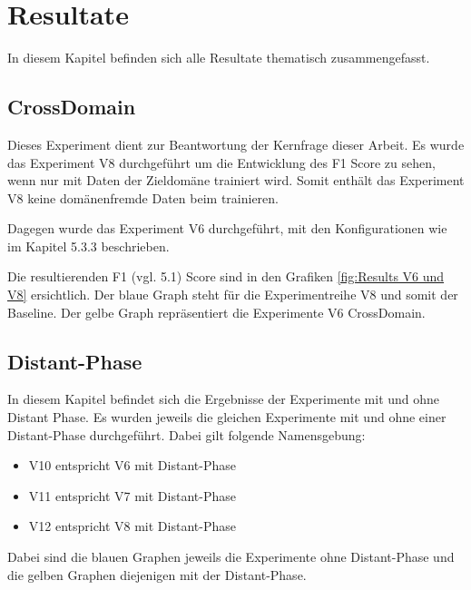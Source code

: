\chapter{Resultate}
In diesem Kapitel befinden sich alle Resultate thematisch zusammengefasst.

\section{CrossDomain}
Dieses Experiment dient zur Beantwortung der Kernfrage dieser Arbeit. Es wurde das Experiment V8 durchgeführt um die Entwicklung des F1 Score zu sehen, wenn nur mit Daten der Zieldomäne trainiert wird. Somit enthält das Experiment V8 keine domänenfremde Daten beim trainieren.

Dagegen wurde das Experiment V6 durchgeführt, mit den Konfigurationen wie im Kapitel 5.3.3 beschrieben.

Die resultierenden F1 (vgl. 5.1) Score sind in den Grafiken \ref{fig:Results V6 und V8} ersichtlich. Der blaue Graph steht für die Experimentreihe V8 und somit der Baseline. Der gelbe Graph repräsentiert die Experimente V6 CrossDomain.


\section{Distant-Phase}
In diesem Kapitel befindet sich die Ergebnisse der Experimente mit und ohne Distant Phase. Es wurden jeweils die gleichen Experimente mit und ohne einer Distant-Phase durchgeführt. Dabei gilt folgende Namensgebung:
\begin{itemize}  
	\item V10 entspricht V6 mit Distant-Phase
	\item V11 entspricht V7 mit Distant-Phase
	\item V12 entspricht V8 mit Distant-Phase
\end{itemize}
Dabei sind die blauen Graphen jeweils die Experimente ohne Distant-Phase und die gelben Graphen diejenigen mit der Distant-Phase.

